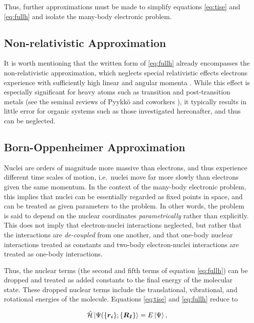 Thus, further approximations must be made to simplify equations \ref{eq:tise}
and \ref{eq:fullh} and isolate the many-body electronic problem.

\subsection{Non-relativistic Approximation}

It is worth mentioning that the written form of \ref{eq:fullh} already
encompasses the non-relativistic approximation, which neglects special
relativistic effects electrons experience with sufficiently high linear and
angular momenta \cite{rel1, rel2}. While this effect is especially significant
for heavy atoms such as transition and post-transition metals (see the seminal
reviews of Pyykk{\"o} and coworkers \cite{pyykko1, pyykko2, pyykko3}), it
typically results in little error for organic systems such as those investigated
hereonafter, and thus can be neglected.

\subsection{Born-Oppenheimer Approximation}

Nuclei are orders of magnitude more massive than electrons, and thus experience
different time scales of motion, i.e.\ nuclei move far more slowly than
electrons given the same momentum. In the context of the many-body electronic
problem, this implies that nuclei can be essentially regarded as fixed points in
space, and can be treated as given parameters to the problem. In other words,
the problem is said to depend on the nuclear coordinates \emph{parametrically}
rather than explicitly. This does not imply that electron-nuclei interactions
neglected, but rather that the interactions are \emph{de-coupled} from one
another, and that one-body nuclear interactions treated as constants and
two-body electron-nuclei interactions are treated as one-body interactions.

Thus, the nuclear terms (the second and fifth terms of equation \ref{eq:fullh})
can be dropped and treated as added constants to the final energy of the
molecular state. These dropped nuclear terms include the translational,
vibrational, and rotational energies of the molecule. Equations \ref{eq:tise}
and \ref{eq:fullh} reduce to

\begin{equation}
	\hat{\mathcal{H}} \ket{\Psi(\{\bm{r_i}\} ; \{\bm{R_I}\}} = E \ket\Psi,
\label{eq:BO}
\end{equation}

